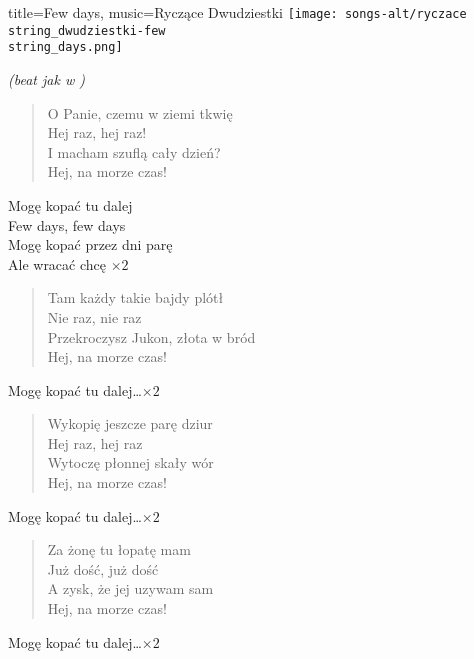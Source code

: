 \newpage
\begin{song}{title={Few days}, music={Ryczące Dwudziestki}}
\texttt{[image: songs-alt/ryczace\\string\_dwudziestki-few\\string\_days.png]}
    \begin{info}
        \textit{(beat jak w )}
    \end{info}
    \begin{multicols}{2}
    \begin{verse}
        O Panie, czemu w ziemi tkwię \\
		Hej raz, hej raz! \\
		I macham szuflą cały dzień? \\
		Hej, na morze czas! 
    \end{verse}
    \begin{chorus}
        Mogę kopać tu dalej \\
		Few days, few days \\
		Mogę kopać przez dni parę \\ 
		Ale wracać chcę  $\times 2$ 
    \end{chorus}
    \begin{verse}
        Tam każdy takie bajdy plótł \\
		Nie raz, nie raz \\
		Przekroczysz Jukon, złota w bród \\
		Hej, na morze czas! 
    \end{verse}
    \begin{chorus}
        Mogę kopać tu dalej\ldots $\times 2$ 
    \end{chorus}
    \begin{verse}
        Wykopię jeszcze parę dziur \\
		Hej raz, hej raz \\
		Wytoczę płonnej skały wór \\
		Hej, na morze czas!
    \end{verse}
    \begin{chorus}
        Mogę kopać tu dalej\ldots $\times 2$ 
    \end{chorus}
    \begin{verse}
        Za żonę tu łopatę mam \\
		Już dość, już dość \\
		A zysk, że jej uzywam sam \\
		Hej, na morze czas!
    \end{verse}
    \begin{chorus}
        Mogę kopać tu dalej\ldots $\times 2$ 

\end{chorus}
\end{multicols}
\end{song}
